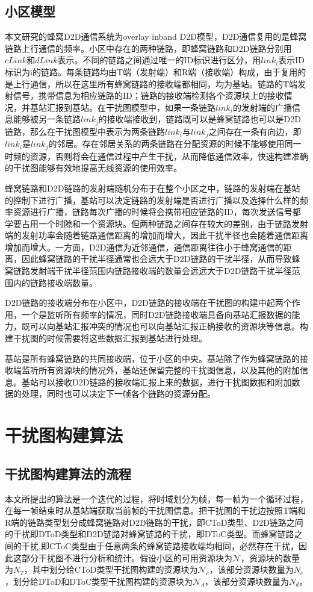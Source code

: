 \documentclass[figurelist,tablelist,algorithmlist,nomlist,masters]{seuthesix}
\begin{document}
	\subsection{小区模型}
	本文研究的蜂窝D2D通信系统为overlay inband D2D模型，D2D通信复用的是蜂窝链路上行通信的频率。小区中存在的两种链路，即蜂窝链路和D2D链路分别用$cLink$和$dLink$表示。不同的链路之间通过唯一的ID标识进行区分，用$link_i$表示ID标识为i的链路。每条链路均由T端（发射端）和R端（接收端）构成，由于复用的是上行通信，所以在这里所有蜂窝链路的接收端都相同，均为基站。链路的T端发射信号，携带信息为相应链路的ID；链路的接收端检测各个资源块上的接收情况，并基站汇报到基站。在干扰图模型中，如果一条链路$link_i$的发射端的广播信息能够被另一条链路$link_j$的接收端接收到，链路既可以是蜂窝链路也可以是D2D链路，那么在干扰图模型中表示为两条链路$link_i$与$link_j$之间存在一条有向边，即$link_i$是$link_j$的邻居。存在邻居关系的两条链路在分配资源的时候不能够使用同一时频的资源，否则将会在通信过程中产生干扰，从而降低通信效率，快速构建准确的干扰图能够有效地提高无线资源的使用效率。

	蜂窝链路和D2D链路的发射端随机分布于在整个小区之中，链路的发射端在基站的控制下进行广播，基站可以决定链路的发射端是否进行广播以及选择什么样的频率资源进行广播，链路每次广播的时候将会携带相应链路的ID，每次发送信号都学要占用一个时隙和一个资源块。但两种链路之间存在较大的差别，由于链路发射端的发射功率会随着链路通信距离的增加而增大，因此干扰半径也会随着通信距离增加而增大。一方面，D2D通信为近邻通信，通信距离往往小于蜂窝通信的距离，因此蜂窝链路的干扰半径通常也会远大于D2D链路的干扰半径，从而导致蜂窝链路发射端干扰半径范围内链路接收端的数量会远远大于D2D链路干扰半径范围内的链路接收端数量。

	D2D链路的接收端分布在小区中，D2D链路的接收端在干扰图的构建中起两个作用，一个是监听所有频率的情况，同时D2D链路接收端具备向基站汇报数据的能力，既可以向基站汇报冲突的情况也可以向基站汇报正确接收的资源块等信息。构建干扰图的时候需要将这些数据汇报到基站进行处理。

	基站是所有蜂窝链路的共同接收端，位于小区的中央。基站除了作为蜂窝链路的接收端监听所有资源块的情况外，基站还保留完整的干扰图信息，以及其他的附加信息。基站可以接收D2D链路的接收端汇报上来的数据，进行干扰图数据和附加数据的处理，同时也可以决定下一帧各个链路的资源分配。


	\section{干扰图构建算法}

	\subsection{干扰图构建算法的流程}
	本文所提出的算法是一个迭代的过程，将时域划分为帧，每一帧为一个循环过程，在每一帧结束时从基站端获取当前帧的干扰图信息。把干扰图的干扰边按照T端和R端的链路类型划分成蜂窝链路对D2D链路的干扰，即CToD类型、D2D链路之间的干扰即DToD类型和D2D链路对蜂窝链路的干扰，即DToC类型。而蜂窝链路之间的干扰,即CToC类型由于任意两条的蜂窝链路接收端均相同，必然存在干扰，因此这部分干扰图不进行分析和统计。假设小区的可用资源块为$\mathcal{N}$，资源块的数量为$N_T$，其中划分给CToD类型干扰图构建的资源块为$\mathcal{N}_c$，该部分资源块数量为$N_c$，划分给DToD和DToC类型干扰图构建的资源块为$\mathcal{N}_d$，该部分资源块数量为$N_d$。
\end{document}
